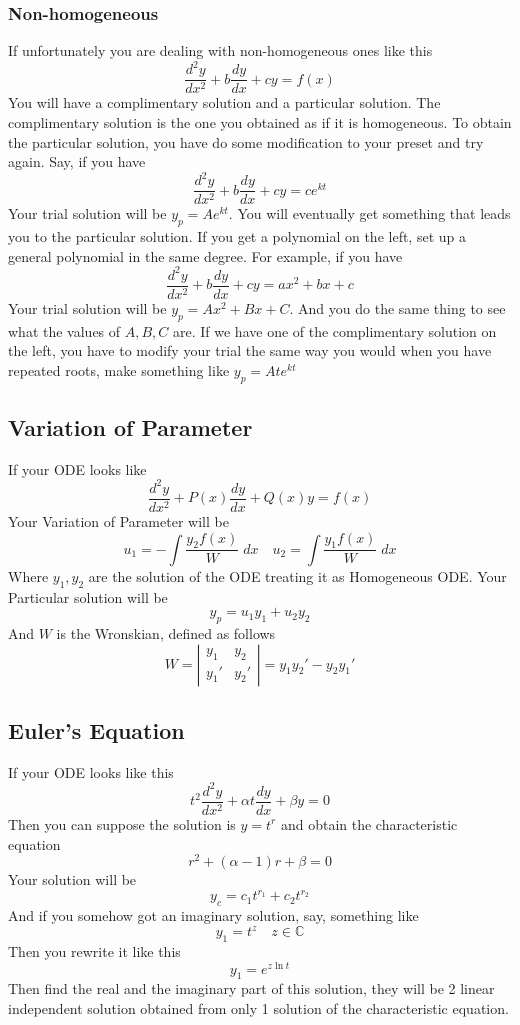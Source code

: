\documentclass[12pt]{article}
\newcommand{\C}{\mathbb{C}}
\newcommand{\dydx}[2]{\frac{d #1}{d #2}}
\newcommand{\abso}[1]{\left|#1 \right|}
\begin{document}
\subsubsection{Non-homogeneous}
If unfortunately you are dealing with non-homogeneous ones like this
\[
\dydx{^2y}{x^2} + b\dydx{y}{x}+ cy = f(x)
\]
You will have a complimentary solution and a particular solution. The complimentary solution is the one you obtained as if it is homogeneous. To obtain the particular solution, you have do some modification to your preset and try again. Say, if you have
\[
\dydx{^2y}{x^2} + b\dydx{y}{x}+ cy = ce^{kt}
\]
Your trial solution will be $y_p = Ae^{kt}$. You will eventually get something that leads you to the particular solution. If you get a polynomial on the left, set up a general polynomial in the same degree. For example, if you have
\[
\dydx{^2y}{x^2} + b\dydx{y}{x}+ cy = ax^2 + bx +c
\]
Your trial solution will be $y_p = Ax^2 + Bx +C$. And you do the same thing to see what the values of $A,B,C$ are. If we have one of the complimentary solution on the left, you have to modify your trial the same way you would when you have repeated roots, make something like $y_p=Ate^{kt}$ 

\subsection{Variation of Parameter}
If your ODE looks like
\[
\dydx{^2y}{x^2} + P(x)\dydx{y}{x} + Q(x)y = f(x)
\]
Your Variation of Parameter will be
\[
u_1 = -\int \frac{y_2f(x)}{W}\; dx \quad u_2 = \int \frac{y_1 f(x)}{W}\; dx
\]
Where $y_1, y_2$ are the solution of the ODE treating it as Homogeneous ODE. Your Particular solution will be
\[
y_p = u_1y_1 + u_2y_2
\]
And $W$ is the Wronskian, defined as follows
\[
W = \abso{
\begin{matrix}
    y_1 & y_2\\
    y_1' & y_2'
\end{matrix}
} = y_1y_2' - y_2y_1'
\]

\subsection{Euler's Equation}
If your ODE looks like this
\[
t^2\dydx{^2y}{x^2} + \alpha t \dydx{y}{x} + \beta y = 0
\]
Then you can suppose the solution is $y=t^r$ and obtain the characteristic equation
\[
r^2 +(\alpha -1) r + \beta = 0
\]
Your solution will be
\[
y_c = c_1 t^{r_1} + c_2 t^{r_2}
\]
And if you somehow got an imaginary solution, say, something like
\[
y_1 = t^z \quad z \in \C
\]
Then you rewrite it like this
\[
y_1 = e^{z\ln t}
\]
Then find the real and the imaginary part of this solution, they will be 2 linear independent solution obtained from only 1 solution of the characteristic equation. 
\end{document}
